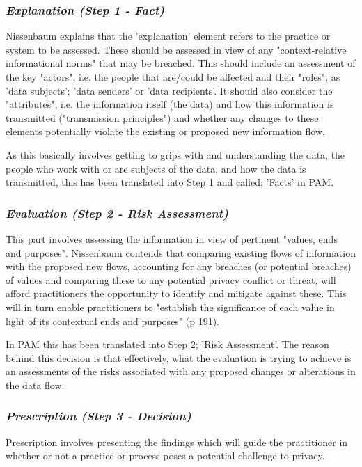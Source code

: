 \subsubsection {{\it Explanation (Step 1 - Fact)}}

Nissenbaum explains that the 'explanation' element refers to the practice or system to be assessed. These should be assessed in view of any "context-relative informational norms" that may be breached. This should include an assessment of the key "actors", i.e. the people that are/could be affected and their "roles", as 'data subjects'; 'data senders' or 'data recipients'. It should also consider the "attributes", i.e. the information itself (the data) and how this information is transmitted ("transmission principles") and whether any changes to these elements potentially violate the existing or proposed new information flow. 

As this basically involves getting to grips with and understanding the data, the people who work with or are subjects of the data, and how the data is transmitted, this has been translated into Step 1 and called; 'Facts' in PAM.  

\subsubsection {{\it Evaluation (Step 2 - Risk Assessment)}}

This part involves assessing the information in view of pertinent "values, ends and purposes". Nissenbaum contends that comparing existing flows of information with the proposed new flows, accounting for any breaches (or potential breaches) of values and comparing these to any potential privacy conflict or threat, will afford practitioners the opportunity to identify and mitigate against these. This will in turn enable practitioners to "establish the significance of each value in light of its contextual ends and purposes" (p 191).

In PAM this has been translated into Step 2; 'Risk Assessment'. The reason behind this decision is that effectively, what the evaluation is trying to achieve is an assessments of the risks associated with any proposed changes or alterations in the data flow. 

\subsubsection {{\it Prescription (Step 3 - Decision)}}

Prescription involves presenting the findings which will guide the practitioner in whether or not a practice or process poses a potential challenge to privacy.

